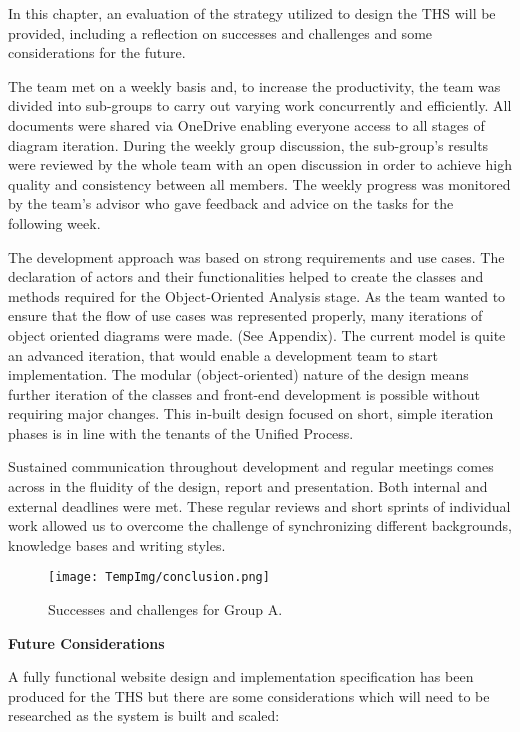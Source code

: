 \documentclass[fontsize=11pt]{extarticle}
\numberwithin{figure}{section} %
\numberwithin{table}{section}%
\begin{document}
In this chapter, an evaluation of the strategy utilized to design the
THS will be provided, including a reflection on successes and challenges
and some considerations for the future.

The team met on a weekly basis and, to increase the productivity, the
team was divided into sub-groups to carry out varying work concurrently
and efficiently. All documents were shared via OneDrive enabling
everyone access to all stages of diagram iteration. During the weekly
group discussion, the sub-group's results were reviewed by the whole
team with an open discussion in order to achieve high quality and
consistency between all members. The weekly progress was monitored by
the team's advisor who gave feedback and advice on the tasks for the
following week.

The development approach was based on strong requirements and use cases.
The declaration of actors and their functionalities helped to create the
classes and methods required for the Object-Oriented Analysis stage. As
the team wanted to ensure that the flow of use cases was represented
properly, many iterations of object oriented diagrams were made. (See
Appendix). The current model is quite an advanced iteration, that would
enable a development team to start implementation. The modular
(object-oriented) nature of the design means further iteration of the
classes and front-end development is possible without requiring major
changes. This in-built design focused on short, simple iteration phases
is in line with the tenants of the Unified Process.

Sustained communication throughout development and regular meetings
comes across in the fluidity of the design, report and presentation.
Both internal and external deadlines were met. These regular reviews and
short sprints of individual work allowed us to overcome the challenge of
synchronizing different backgrounds, knowledge bases and writing styles.

\begin{figure}[H]
      \centering
      \texttt{[image: TempImg/conclusion.png]}
      \caption{Successes and challenges for Group A.}
 \end{figure}

\textbf{Future Considerations}

A fully functional website design and implementation specification has
been produced for the THS but there are some considerations which will
need to be researched as the system is built and scaled:
\end{document}
